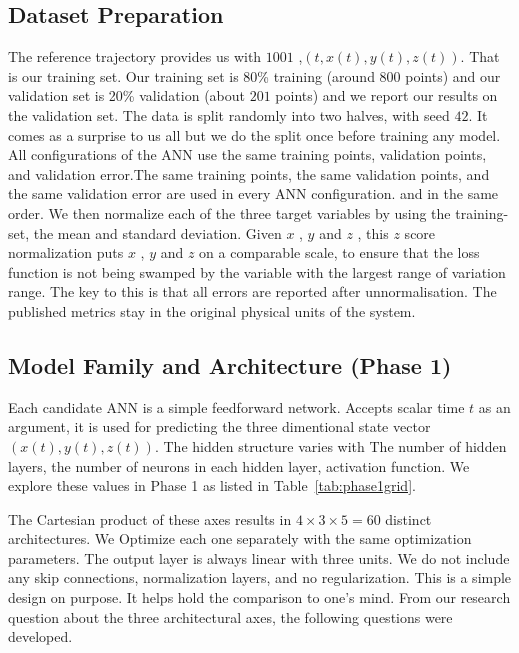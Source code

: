 \subsection{Dataset Preparation}

The reference trajectory provides us with $1001$ ,$(t, x(t), y(t), z(t))$. That is our training set. Our training set is 80\% training (around $800$ points) and our validation set is 20\% validation (about $201$ points) and we report our results on the validation set. The data is split randomly into two halves, with seed $42$. It comes as a surprise to us all but we do the split once before training any model. All configurations of the ANN use the same training points, validation points, and validation error.The same training points, the same validation points, and the same validation error are used in every ANN configuration.
and in the same order. 
We then normalize each of the three target variables by using the training-set,
the mean and standard deviation. Given $x$ , $y$ and $z$ , this $z$ score normalization puts $x$ , $y$ and $z$ on a comparable scale, to ensure that the loss function is not being swamped by the variable with the largest range of variation range. The key to this is that all errors are reported after unnormalisation. The published metrics stay in the original physical units of the system.


\subsection{Model Family and Architecture (Phase 1)}

Each candidate ANN is a simple feedforward network.  Accepts scalar time $t$ as an argument, it is used for predicting the three dimentional state vector $(x(t), y(t), z(t))$. The hidden structure varies with The number of hidden layers, the number of neurons in each hidden layer, activation function. We explore these values in Phase 1 as listed in Table~\ref{tab:phase1grid}. 

The Cartesian product of these axes results in $4 \times 3 \times 5 = 60$ distinct architectures. We
Optimize each one separately with the same optimization parameters. The output layer is
always linear with three units. We do not include any skip connections, normalization layers, and
no regularization. This is a simple design on purpose. It helps hold the comparison to one's mind. From our research question about the three architectural axes, the following questions were developed.


